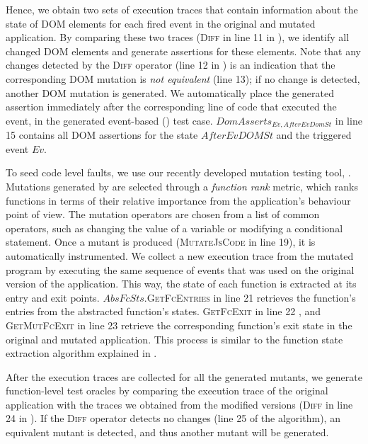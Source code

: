 Hence, we obtain two sets of execution traces that contain information about the state of DOM elements for each fired event in the original and mutated application. By comparing these two traces (\textsc{Diff} in line 11 in ), we identify all changed DOM elements and generate assertions for these elements. 
Note that  any changes detected by the \textsc{Diff} operator (line 12 in ) is an indication that the corresponding DOM mutation is \emph{not equivalent} (line 13); if no change is detected, another DOM mutation is generated. 
We automatically place the generated assertion immediately after the corresponding line of code that executed the event, in the generated event-based (\selenium) test case. $DomAsserts_{Ev,AfterEvDomSt}$ in line 15 contains all DOM assertions for the state $AfterEvDOMSt$ and the triggered event $Ev$.
  
 To seed code level faults, we use our recently developed \javascript mutation testing tool, \mutandis \cite{mirshokraie:icst13}. Mutations generated by \mutandis are selected through a \emph{function rank} metric, which ranks functions in terms of their relative importance from the application's behaviour point of view. 
The mutation operators are chosen from a list of common operators, such as changing the value of a variable or modifying a conditional statement. 
Once a mutant is produced (\textsc{MutateJsCode} in line 19), it is automatically instrumented.
We collect a new execution trace from the mutated  program by executing the same sequence of events that was used on the original version of the application. This way, the state of each \javascript function is extracted at its entry and exit points. $AbsFcSts.$\textsc{GetFcEntries} in line 21 retrieves the function's entries from the abstracted function's states. \textsc{GetFcExit} in line 22 , and \textsc{GetMutFcExit} in line 23 retrieve the corresponding function's exit state in the original and mutated application. This process is similar to the function state extraction algorithm explained in .

After the execution traces are collected for all the generated mutants, we generate function-level test oracles by comparing the execution trace of the original application with the traces we obtained from the modified versions (\textsc{Diff} in line 24 in ). 
If the \textsc{Diff} operator detects no changes (line 25 of the algorithm), an equivalent mutant is detected, and thus another mutant will be generated. 

